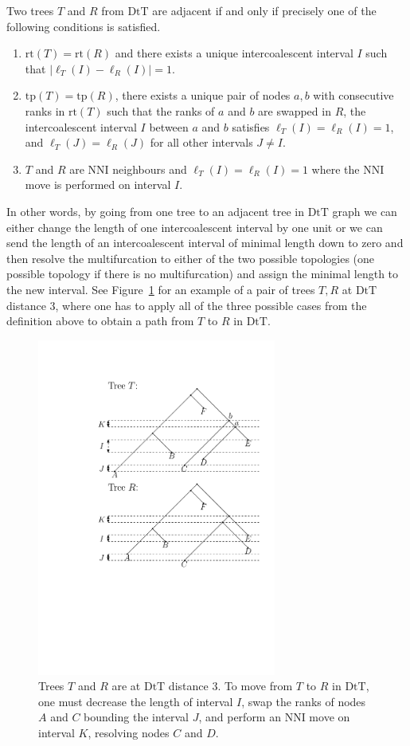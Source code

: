 \documentclass{amsart}
\newcommand{\dts}{\mathrm{DtT}}
\newcommand{\rt}{\mathrm{rt}}
\newcommand{\tp}{\mathrm{tp}}
\begin{document}
Two trees $T$ and $R$ from $\dts$ are adjacent if and only if precisely one of the following conditions is satisfied.
\begin{enumerate}[(1)]
\item $\rt(T) = \rt(R)$ and there exists a unique intercoalescent interval $I$ such that $|\ell_T(I) - \ell_R(I)| = 1$.
\item $\tp(T) = \tp(R)$, there exists a unique pair of nodes $a,b$ with consecutive ranks in $\rt(T)$ such that the ranks of $a$ and $b$ are swapped in $R$, the intercoalescent interval $I$ between $a$ and $b$ satisfies $\ell_T(I) = \ell_R(I) = 1$, and $\ell_T(J) = \ell_R(J)$ for all other intervals $J \ne I$.
\item $T$ and $R$ are NNI neighbours and $\ell_T(I) = \ell_R(I) = 1$ where the NNI move is performed on interval $I$.
\end{enumerate}

In other words, by going from one tree to an adjacent tree in $\dts$ graph we can either change the length of one intercoalescent interval by one unit or we can send the length of an intercoalescent interval of minimal length down to zero and then resolve the multifurcation to either of the two possible topologies (one possible topology if there is no multifurcation) and assign the minimal length to the new interval.
See Figure~\ref{dts_neighbours.pdf} for an example of a pair of trees $T,R$ at $\dts$ distance $3$, where one has to apply all of the three possible cases from the definition above to obtain a path from $T$ to $R$ in $\dts$.

\begin{figure}
\centering
\includegraphics[width=0.7\textwidth]{dts_neighbours.pdf}
\caption{Trees $T$ and $R$ are at $\dts$ distance $3$.
To move from $T$ to $R$ in $\dts$, one must decrease the length of interval $I$, swap the ranks of nodes $A$ and $C$ bounding the interval $J$, and perform an NNI move on interval $K$, resolving nodes $C$ and $D$.}
\label{dts_neighbours.pdf}
\end{figure}
\end{document}
